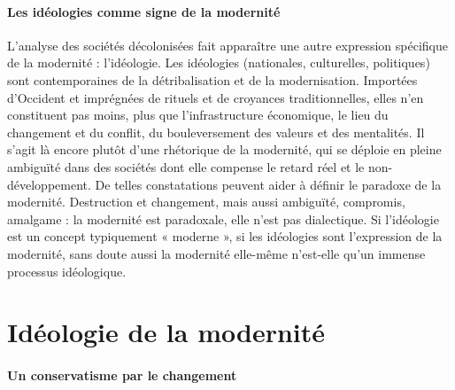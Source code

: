 \paragraph{Les idéologies comme signe de la modernité}

L'analyse des sociétés décolonisées fait apparaître une autre expression spécifique de la modernité : l'idéologie. Les idéologies (nationales, culturelles, politiques) sont contemporaines de la détribalisation et de la modernisation. Importées d'Occident et imprégnées de rituels et de croyances traditionnelles, elles n'en constituent pas moins, plus que l'infrastructure économique, le lieu du changement et du conflit, du bouleversement des valeurs et des mentalités. Il s'agit là encore plutôt d'une rhétorique de la modernité, qui se déploie en pleine ambiguïté dans des sociétés dont elle compense le retard réel et le non- développement.
De telles constatations peuvent aider à définir le paradoxe de la modernité. Destruction et changement, mais aussi ambiguïté, compromis, amalgame : la modernité est paradoxale, elle n'est pas dialectique. Si l'idéologie est un concept typiquement « moderne », si les idéologies sont l'expression de la modernité, sans doute aussi la modernité elle-même n'est-elle qu'un immense processus idéologique.

\section{Idéologie de la modernité}

\paragraph{Un conservatisme par le changement}

